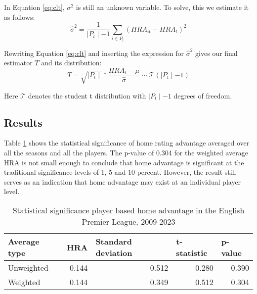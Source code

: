 \noindent
In Equation \eqref{eq:clt}, $\sigma^2$ is still an unknown variable. To solve, this we estimate it as follows:
\begin{equation}
    \label{eq:variance_estimator}
    \hat{\sigma}^2 = \frac{1}{\mid P_t \mid - 1} \sum_{i \in P_t}(HRA_{it} - HRA_t)^2
\end{equation}

\noindent
Rewriting Equation \eqref{eq:clt} and inserting the expression for $\hat{\sigma}^2$ gives our final estimator $T$ and its distribution:
\begin{equation}
    \label{eq:final_estimator_t}
    T = \sqrt{\mid P_t \mid} * \frac{HRA_t-\mu}{\hat\sigma} \sim \mathcal{T}(\mid P_t \mid - 1)
\end{equation}

\noindent
Here $\mathcal{T}$ denotes the student t distribution with $\mid P_t \mid - 1$ degrees of freedom.

\subsection*{Results}
Table \ref{tab:statistical_significance_hra_full_sample} shows the statistical significance of home rating advantage averaged over all the seasons and all the players. The p-value of 0.304 for the weighted average HRA is not small enough to conclude that home advantage is significant at the traditional significance levels of 1, 5 and 10 percent. However, the result still serves as an indication that home advantage may exist at an individual player level.

\begin{table}[htbp]
    \begin{spacing}{1.5}
    \centering
    \small
    \caption{Statistical significance player based home advantage in the English Premier League, 2009-2023}
    \label{tab:statistical_significance_hra_full_sample}
    \begin{tabular}{lrrrr}
        \toprule
        \toprule
        \textbf{Average type} & \multicolumn{1}{l}{\textbf{HRA}} & \multicolumn{1}{l}{\textbf{Standard deviation}} & \multicolumn{1}{l}{\textbf{t-statistic}} & \multicolumn{1}{l}{\textbf{p-value}} \\
        \midrule
        Unweighted & 0.144 & 0.512 & 0.280 & 0.390 \\
        Weighted & 0.144 & 0.349 & 0.512 & 0.304 \\
        \bottomrule
        \bottomrule
    \end{tabular}
    \end{spacing}
\end{table}

